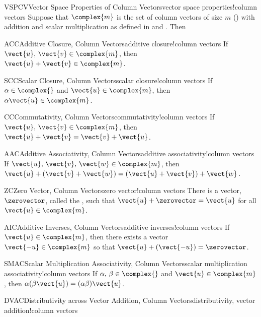 \begin{theorem}{VSPCV}{Vector Space Properties of Column Vectors}{vector space properties!column vectors}
Suppose that $\complex{m}$ is the set of column vectors of size $m$ () with addition and scalar multiplication as defined in  and .  Then
%
\begin{propertylist}
%
\begin{property}{ACC}{Additive Closure, Column Vectors}{additive closure!column vectors}
If $\vect{u},\,\vect{v}\in\complex{m}$, then $\vect{u}+\vect{v}\in\complex{m}$.\end{property}
%
\begin{property}{SCC}{Scalar Closure, Column Vectors}{scalar closure!column vectors}
If $\alpha\in\complex{\null}$ and $\vect{u}\in\complex{m}$, then $\alpha\vect{u}\in\complex{m}$.\end{property}
%
\begin{property}{CC}{Commutativity, Column Vectors}{commutativity!column vectors}
If $\vect{u},\,\vect{v}\in\complex{m}$, then $\vect{u}+\vect{v}=\vect{v}+\vect{u}$.\end{property}
%
\begin{property}{AAC}{Additive Associativity, Column Vectors}{additive associativity!column vectors}
If $\vect{u},\,\vect{v},\,\vect{w}\in\complex{m}$, then $\vect{u}+\left(\vect{v}+\vect{w}\right)=\left(\vect{u}+\vect{v}\right)+\vect{w}$.\end{property}
%
\begin{property}{ZC}{Zero Vector, Column Vectors}{zero vector!column vectors}
There is a vector, $\zerovector$, called the , such that  $\vect{u}+\zerovector=\vect{u}$  for all $\vect{u}\in\complex{m}$.\end{property}
%
\begin{property}{AIC}{Additive Inverses, Column Vectors}{additive inverses!column vectors}
If  $\vect{u}\in\complex{m}$, then there exists a vector $\vect{-u}\in\complex{m}$ so that $\vect{u}+ (\vect{-u})=\zerovector$.\end{property}
%
\begin{property}{SMAC}{Scalar Multiplication Associativity, Column Vectors}{scalar multiplication associativity!column vectors}
If $\alpha,\,\beta\in\complex{\null}$ and $\vect{u}\in\complex{m}$, then $\alpha(\beta\vect{u})=(\alpha\beta)\vect{u}$.\end{property}
%
\begin{property}{DVAC}{Distributivity across Vector Addition, Column Vectors}{distributivity, vector addition!column vectors}

\end{property}
\end{propertylist}
\end{theorem}
